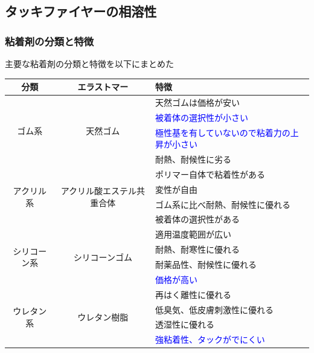 \documentclass[unicode,12pt]{beamer}%
\begin{document}
\subsection{タッキファイヤーの相溶性}
\begin{frame}
	\frametitle{粘着剤の分類と特徴}

		主要な粘着剤の分類と特徴を以下にまとめた

		\begin{table}[tb]
			\tiny
			\centering
				\begin{tabular}{ccl}
				\toprule
				分類&エラストマー&特徴 \\
				\midrule
				\multirow{4}{*}{ゴム系}&\multirow{4}{*}{天然ゴム}&天然ゴムは価格が安い\\
				&&\textcolor{blue}{被着体の選択性が小さい}\\
				&&\textcolor{blue}{極性基を有していないので粘着力の上昇が小さい}\\
				&&耐熱、耐候性に劣る\\
				\midrule
				\multirow{4}{*}{アクリル系}&\multirow{4}{*}{アクリル酸エステル共重合体}&\alert{ポリマー自体で粘着性がある}\\
				&&\alert{変性が自由}\\
				&&ゴム系に比べ耐熱、耐候性に優れる\\
				&&被着体の選択性がある\\
				\midrule
				\multirow{4}{*}{シリコーン系}&\multirow{4}{*}{シリコーンゴム}&適用温度範囲が広い\\
				&&耐熱、耐寒性に優れる\\
				&&耐薬品性、耐候性に優れる\\
				&&\textcolor{blue}{価格が高い}\\
				\midrule
				\multirow{4}{*}{ウレタン系}&\multirow{4}{*}{ウレタン樹脂}&再はく離性に優れる\\
				&&低臭気、低皮膚刺激性に優れる\\
				&&透湿性に優れる\\
				&&\textcolor{blue}{強粘着性、タックがでにくい}\\
				\bottomrule
				\end{tabular}
		\end{table}
\end{frame}
\end{document}
